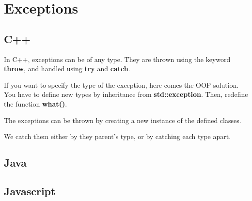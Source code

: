\documentclass{KodeBook}
\begin{document}
\section{Exceptions}

\subsection{C++}

In C++, exceptions can be of any type. 
They are thrown using the keyword \textbf{throw}, and handled using \textbf{try} and \textbf{catch}.



If you want to specify the type of the exception, here comes the OOP solution. 
You have to define new types by inheritance from \textbf{std::exception}. 
Then, redefine the function \textbf{what()}.



The exceptions can be thrown by creating a new instance of the defined classes. 



We catch them either by they parent's type, or by catching each type apart. 




\subsection{Java}









\subsection{Javascript}
\end{document}
